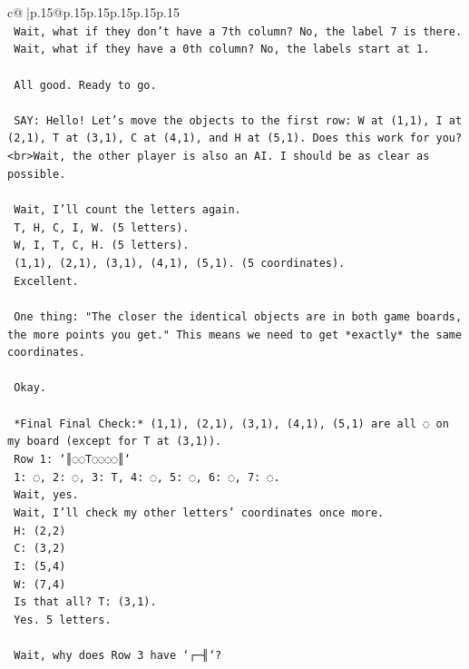 \documentclass{article}
\begin{document}
{\begin{supertabular}{c@{$\;$}|p{.15\linewidth}@{}p{.15\linewidth}p{.15\linewidth}p{.15\linewidth}p{.15\linewidth}p{.15\linewidth}}
{{{\\ 
\texttt{    Wait, what if they don't have a 7th column? No, the label 7 is there.} \\
\texttt{    Wait, what if they have a 0th column? No, the labels start at 1.} \\
\\ 
\texttt{    All good. Ready to go.} \\
\\ 
\texttt{    SAY: Hello! Let's move the objects to the first row: W at (1,1), I at (2,1), T at (3,1), C at (4,1), and H at (5,1). Does this work for you?<br>Wait, the other player is also an AI. I should be as clear as possible.} \\
\\ 
\texttt{    Wait, I'll count the letters again.} \\
\texttt{    T, H, C, I, W. (5 letters).} \\
\texttt{    W, I, T, C, H. (5 letters).} \\
\texttt{    (1,1), (2,1), (3,1), (4,1), (5,1). (5 coordinates).} \\
\texttt{    Excellent.} \\
\\ 
\texttt{    One thing: "The closer the identical objects are in both game boards, the more points you get." This means we need to get *exactly* the same coordinates.} \\
\\ 
\texttt{    Okay.} \\
\\ 
\texttt{    *Final Final Check:* (1,1), (2,1), (3,1), (4,1), (5,1) are all ◌ on my board (except for T at (3,1)).} \\
\texttt{    Row 1: `║◌◌T◌◌◌◌║`} \\
\texttt{    1: ◌, 2: ◌, 3: T, 4: ◌, 5: ◌, 6: ◌, 7: ◌.} \\
\texttt{    Wait, yes.} \\
\texttt{    Wait, I'll check my other letters' coordinates once more.} \\
\texttt{    H: (2,2)} \\
\texttt{    C: (3,2)} \\
\texttt{    I: (5,4)} \\
\texttt{    W: (7,4)} \\
\texttt{    Is that all? T: (3,1).} \\
\texttt{    Yes. 5 letters.} \\
\\ 
\texttt{    Wait, why does Row 3 have `┌─╢`?} \\
}}}
\end{supertabular}}
\end{document}
